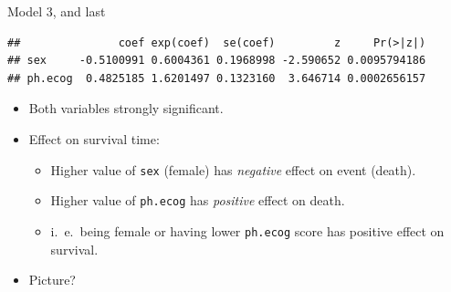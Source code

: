 \begin{frame}[fragile]{Model 3, and last}


{\footnotesize

 
\begin{knitrout}
\color{fgcolor}\begin{kframe}
\begin{alltt}
\hlkwb{=}\hlopt{~}\hlopt{-}\hlopt{-}
\hlopt{$}
\end{alltt}
\begin{verbatim}
##               coef exp(coef)  se(coef)         z     Pr(>|z|)
## sex     -0.5100991 0.6004361 0.1968998 -2.590652 0.0095794186
## ph.ecog  0.4825185 1.6201497 0.1323160  3.646714 0.0002656157
\end{verbatim}
\end{kframe}
\end{knitrout}
}


\begin{itemize}
\item Both variables strongly significant.
\item Effect on survival time:
  \begin{itemize}
  \item Higher value of \texttt{sex} (female) has \emph{negative} effect
    on event (death).
  \item Higher value of \texttt{ph.ecog} has \emph{positive} effect on death.
  \item i.\ e.\ being female or having lower \texttt{ph.ecog} score has
    positive effect on survival.
  \end{itemize}
\item Picture?
\end{itemize}
  
\end{frame}

